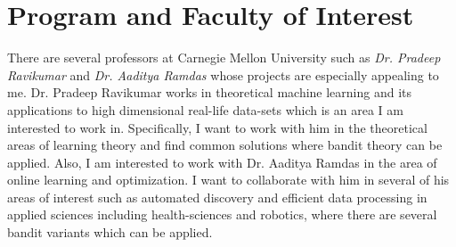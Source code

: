 \documentclass[twoside]{article}
\begin{document}
\section{Program and Faculty of Interest}

There are several professors at Carnegie Mellon University such as \textit{Dr. Pradeep Ravikumar} and \textit{Dr. Aaditya Ramdas} whose projects are especially appealing to me. Dr. Pradeep Ravikumar works in theoretical machine learning and its applications to high dimensional real-life data-sets which is an area I am interested to work in. Specifically, I want to work with him in the theoretical areas of learning theory and find common solutions where bandit theory can be applied. Also, I am interested to work with Dr. Aaditya Ramdas in the area of online learning and optimization. I want to collaborate with him in several of his areas of interest such as automated discovery and efficient data processing in applied sciences including health-sciences and robotics, where there are several bandit variants which can be applied.
\end{document}
